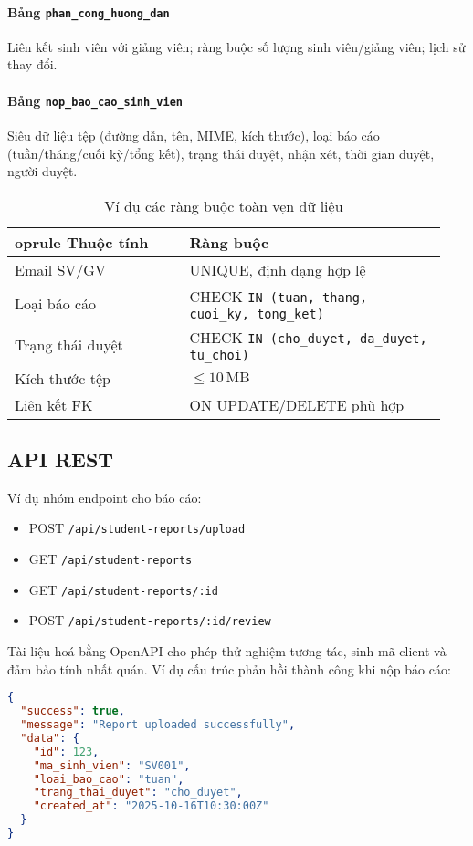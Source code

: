 \documentclass[conference]{IEEEtran}
\begin{document}
\paragraph{Bảng \texttt{phan\_cong\_huong\_dan}} Liên kết sinh viên với giảng viên; ràng buộc số lượng sinh viên/giảng viên; lịch sử thay đổi.

\paragraph{Bảng \texttt{nop\_bao\_cao\_sinh\_vien}} Siêu dữ liệu tệp (đường dẫn, tên, MIME, kích thước), loại báo cáo (tuần/tháng/cuối kỳ/tổng kết), trạng thái duyệt, nhận xét, thời gian duyệt, người duyệt.

\begin{table}[t]
  \centering
  \caption{Ví dụ các ràng buộc toàn vẹn dữ liệu}
  \label{tab:constraints}
  \begin{tabular}{p{0.38\linewidth}p{0.56\linewidth}}
    	oprule
    Thuộc tính & Ràng buộc \\
    \midrule
    Email SV/GV & UNIQUE, định dạng hợp lệ \\
    Loại báo cáo & CHECK \texttt{IN (tuan, thang, cuoi\_ky, tong\_ket)} \\
    Trạng thái duyệt & CHECK \texttt{IN (cho\_duyet, da\_duyet, tu\_choi)} \\
    Kích thước tệp & \(\leq 10\,\mathrm{MB}\) \\
    Liên kết FK & ON UPDATE/DELETE phù hợp \\
    \bottomrule
  \end{tabular}
\end{table}

\subsection{API REST}
Ví dụ nhóm endpoint cho báo cáo:
\begin{itemize}
  \item POST \texttt{/api/student-reports/upload}
  \item GET \texttt{/api/student-reports}
  \item GET \texttt{/api/student-reports/:id}
  \item POST \texttt{/api/student-reports/:id/review}
\end{itemize}
Tài liệu hoá bằng OpenAPI \cite{openapi} cho phép thử nghiệm tương tác, sinh mã client và đảm bảo tính nhất quán. Ví dụ cấu trúc phản hồi thành công khi nộp báo cáo:
\begin{lstlisting}[language=json]
{
  "success": true,
  "message": "Report uploaded successfully",
  "data": {
    "id": 123,
    "ma_sinh_vien": "SV001",
    "loai_bao_cao": "tuan",
    "trang_thai_duyet": "cho_duyet",
    "created_at": "2025-10-16T10:30:00Z"
  }
}
\end{lstlisting}
\end{document}
